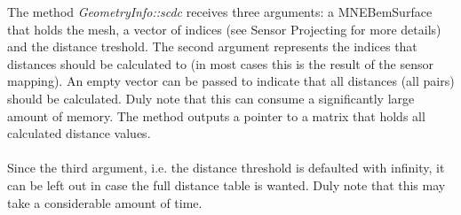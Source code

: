 The method \textit{GeometryInfo::scdc} receives three arguments: a MNEBemSurface that holds the mesh, a vector of indices (see Sensor Projecting for more details) and the distance treshold. The second argument represents the indices that distances should be calculated to (in most cases this is the result of the sensor mapping). An empty vector can be passed to indicate that all distances (all pairs) should be calculated. Duly note that this can consume a significantly large amount of memory. The method outputs a pointer to a matrix that holds all calculated distance values.\\
\\
Since the third argument, i.e. the distance threshold is defaulted with infinity, it can be left out in case the full distance table is wanted. Duly note that this may take a considerable amount of time.

